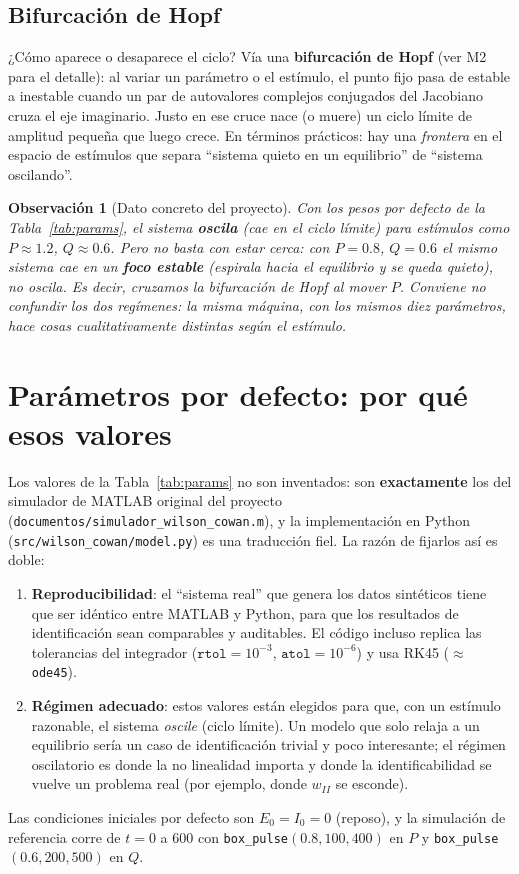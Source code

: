 \documentclass[11pt,a4paper]{article}
\newtheorem{remark}{Observación}
\begin{document}
\subsection{Bifurcación de Hopf}
¿Cómo aparece o desaparece el ciclo? Vía una \textbf{bifurcación de Hopf} (ver M2 para el detalle): al variar un parámetro o el estímulo, el punto fijo pasa de estable a inestable cuando un par de autovalores complejos conjugados del Jacobiano cruza el eje imaginario. Justo en ese cruce nace (o muere) un ciclo límite de amplitud pequeña que luego crece. En términos prácticos: hay una \emph{frontera} en el espacio de estímulos que separa ``sistema quieto en un equilibrio'' de ``sistema oscilando''.

\begin{remark}[Dato concreto del proyecto]
Con los pesos por defecto de la Tabla~\ref{tab:params}, el sistema \textbf{oscila} (cae en el ciclo límite) para estímulos como $P\approx1.2$, $Q\approx0.6$. Pero \emph{no} basta con estar cerca: con $P=0.8$, $Q=0.6$ el mismo sistema cae en un \textbf{foco estable} (espirala hacia el equilibrio y se queda quieto), \emph{no} oscila. Es decir, cruzamos la bifurcación de Hopf al mover $P$. Conviene no confundir los dos regímenes: la misma máquina, con los mismos diez parámetros, hace cosas cualitativamente distintas según el estímulo.
\end{remark}

\section{Parámetros por defecto: por qué esos valores}

Los valores de la Tabla~\ref{tab:params} no son inventados: son \textbf{exactamente} los del simulador de MATLAB original del proyecto (\texttt{documentos/simulador\_wilson\_cowan.m}), y la implementación en Python (\texttt{src/wilson\_cowan/model.py}) es una traducción fiel. La razón de fijarlos así es doble:
\begin{enumerate}[nosep]
    \item \textbf{Reproducibilidad}: el ``sistema real'' que genera los datos sintéticos tiene que ser idéntico entre MATLAB y Python, para que los resultados de identificación sean comparables y auditables. El código incluso replica las tolerancias del integrador ($\texttt{rtol}=10^{-3}$, $\texttt{atol}=10^{-6}$) y usa RK45 ($\approx$ \texttt{ode45}).
    \item \textbf{Régimen adecuado}: estos valores están elegidos para que, con un estímulo razonable, el sistema \emph{oscile} (ciclo límite). Un modelo que solo relaja a un equilibrio sería un caso de identificación trivial y poco interesante; el régimen oscilatorio es donde la no linealidad importa y donde la identificabilidad se vuelve un problema real (por ejemplo, donde $w_{II}$ se esconde).
\end{enumerate}
Las condiciones iniciales por defecto son $E_0=I_0=0$ (reposo), y la simulación de referencia corre de $t=0$ a $600$ con \texttt{box\_pulse}$(0.8,100,400)$ en $P$ y \texttt{box\_pulse}$(0.6,200,500)$ en $Q$.
\end{document}
